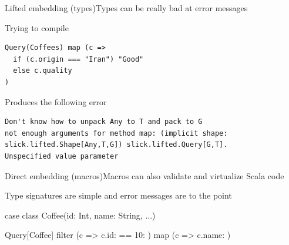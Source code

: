 \documentclass[compress,xcolor={usenames,dvipsnames,table}]{beamer}
\begin{document}
\begin{frame}[fragile]{Lifted embedding (types)}{Types can be really bad at error messages}
  \vspace{1em}
  \begin{exampleblock}{Trying to compile}
    \begin{verbatim}
Query(Coffees) map (c =>
  if (c.origin === "Iran") "Good"
  else c.quality
)\end{verbatim}
  \end{exampleblock}

  \vspace{1em}
  \begin{alertblock}{Produces the following error}
    \begin{verbatim}
Don't know how to unpack Any to T and pack to G
not enough arguments for method map: (implicit shape:
slick.lifted.Shape[Any,T,G]) slick.lifted.Query[G,T].
Unspecified value parameter
    \end{verbatim}
  \end{alertblock}

\end{frame}

\begin{frame}[fragile]{Direct embedding (macros)}{Macros can also validate and virtualize Scala code}
  \vspace{1em}
  \begin{exampleblock}{Type signatures are simple and error messages are to the point}
    \begin{semiverbatim}
case class Coffee(id: Int, name: String, ...)

Query[Coffee] filter
  (c => c.id: \text{\color{blue}{Int}} == 10: \text{\color{blue}{Int}}) map
  (c => c.name: \text{\color{blue}{String}})
    \end{semiverbatim}
  \end{exampleblock}
\end{frame}
\end{document}
